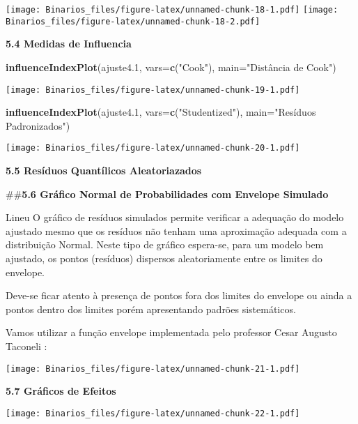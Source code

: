 \documentclass[
]{article}
\newenvironment{Shaded}{\begin{snugshade}}{\end{snugshade}}
\newcommand{\DataTypeTok}[1]{\textcolor[rgb]{0.13,0.29,0.53}{#1}}
\newcommand{\FloatTok}[1]{\textcolor[rgb]{0.00,0.00,0.81}{#1}}
\newcommand{\KeywordTok}[1]{\textcolor[rgb]{0.13,0.29,0.53}{\textbf{#1}}}
\newcommand{\NormalTok}[1]{#1}
\newcommand{\StringTok}[1]{\textcolor[rgb]{0.31,0.60,0.02}{#1}}
\begin{document}
\texttt{[image: Binarios\_files/figure-latex/unnamed-chunk-18-1.pdf]}
\texttt{[image: Binarios\_files/figure-latex/unnamed-chunk-18-2.pdf]}

\textbf{5.4 Medidas de Influencia}

\begin{Shaded}
\begin{Highlighting}[]
\KeywordTok{influenceIndexPlot}\NormalTok{(ajuste4}\FloatTok{.1}\NormalTok{, }\DataTypeTok{vars=}\KeywordTok{c}\NormalTok{(}\StringTok{"Cook"}\NormalTok{), }\DataTypeTok{main=}\StringTok{"Distância de Cook"}\NormalTok{)}
\end{Highlighting}
\end{Shaded}

\texttt{[image: Binarios\_files/figure-latex/unnamed-chunk-19-1.pdf]}

\begin{Shaded}
\begin{Highlighting}[]
\KeywordTok{influenceIndexPlot}\NormalTok{(ajuste4}\FloatTok{.1}\NormalTok{, }\DataTypeTok{vars=}\KeywordTok{c}\NormalTok{(}\StringTok{"Studentized"}\NormalTok{), }\DataTypeTok{main=}\StringTok{"Resíduos Padronizados"}\NormalTok{)}
\end{Highlighting}
\end{Shaded}

\texttt{[image: Binarios\_files/figure-latex/unnamed-chunk-20-1.pdf]}

\textbf{5.5 Resíduos Quantílicos Aleatoriazados}

\#\#\textbf{5.6 Gráfico Normal de Probabilidades com Envelope Simulado}

Lineu O gráfico de resíduos simulados permite verificar a adequação do
modelo ajustado mesmo que os resíduos não tenham uma aproximação
adequada com a distribuição Normal. Neste tipo de gráfico espera-se,
para um modelo bem ajustado, os pontos (resíduos) dispersos
aleatoriamente entre os limites do envelope.

Deve-se ficar atento à presença de pontos fora dos limites do envelope
ou ainda a pontos dentro dos limites porém apresentando padrões
sistemáticos.

Vamos utilizar a função envelope implementada pelo professor Cesar
Augusto Taconeli :

\texttt{[image: Binarios\_files/figure-latex/unnamed-chunk-21-1.pdf]}

\textbf{5.7 Gráficos de Efeitos}

\texttt{[image: Binarios\_files/figure-latex/unnamed-chunk-22-1.pdf]}
\end{document}
